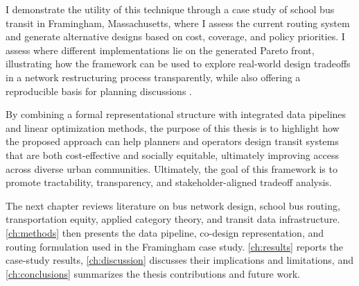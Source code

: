 I demonstrate the utility of this technique through a case study of school bus transit in Framingham, Massachusetts, where I assess the current routing system and generate alternative designs based on cost, coverage, and policy priorities. I assess where different implementations lie on the generated Pareto front, illustrating how the framework can be used to explore real-world design tradeoffs in a network restructuring process transparently, while also offering a reproducible basis for planning discussions \cite{bertsimasBusRoutingOptimization2020}.

By combining a formal representational structure with integrated data pipelines and linear optimization methods, the purpose of this thesis is to highlight how the proposed approach can help planners and operators design transit systems that are both cost-effective and socially equitable, ultimately improving access across diverse urban communities. Ultimately, the goal of this framework is to promote tractability, transparency, and stakeholder-aligned tradeoff analysis.

The next chapter reviews literature on bus network design, school bus routing, transportation equity, applied category theory, and transit data infrastructure. \autoref{ch:methods} then presents the data pipeline, co-design representation, and routing formulation used in the Framingham case study. \autoref{ch:results} reports the case-study results, \autoref{ch:discussion} discusses their implications and limitations, and \autoref{ch:conclusions} summarizes the thesis contributions and future work.
